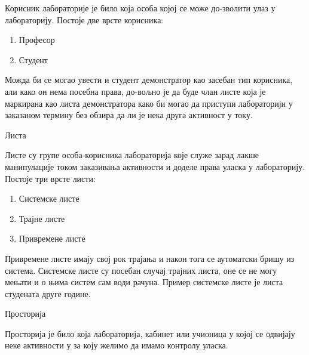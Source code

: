 \documentclass[a4paper, 12pt, diplomski]{etfcyr}
\makeatletter
\gdef\tshortstack{\@ifnextchar[\@tshortstack{\@tshortstack[c]}}
\let\@tshortstack\@shortstack
\makeatother
\begin{document}
\begin{labeling}{\smash{\tshortstack[l]{Корисник\\лабораторије}}}
					\item[\smash{\tshortstack[l]{Корисник\\лабораторије}}]
						\begin{justify}
							Корисник лабораторије је било која особа којој се може до-зволити улаз у лабораторију. Постоје две врсте корисника:
							\begin{enumerate}[noitemsep]
								\item Професор
								\item Студент
							\end{enumerate}
							Можда би се могао увести и студент демонстратор као засебан тип корисника, али како он нема посебна права, до-вољно је да буде члан листе која је маркирана као листа демонстратора како би могао да приступи лабораторији у заказаном термину без обзира да ли је нека друга активност у току.
						\end{justify}

					\item [Листа]
						\begin{justify}
							Листе су групе особа-корисника лабораторија које служе зарад лакше манипулације током заказивања активности и доделе права уласка у лабораторију. Постоје три врсте листи:
							\begin{enumerate}[noitemsep]
								\item Системске листе
								\item Трајне листе
								\item Привремене листе
							\end{enumerate}
							Привремене листе имају свој рок трајања и након тога се аутоматски бришу из система. Системске листе су посебан случај трајних листа, оне се не могу мењати и о њима систем сам води рачуна. Пример системске листе је листа студената друге године.
						\end{justify}

					\item [Просторија]
						\begin{justify}
							Просторија је било која лабораторија, кабинет или учионица у којој се одвијају неке активности у за коју желимо да имамо контролу уласка.
						\end{justify}


\end{labeling}
\end{document}
